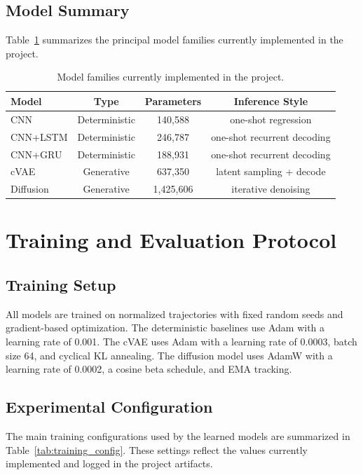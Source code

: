 \documentclass[11pt]{article}
\begin{document}
\subsection{Model Summary}

Table~\ref{tab:model_summary} summarizes the principal model families currently implemented in the project.

\begin{table}[h]
\centering
\caption{Model families currently implemented in the project.}
\label{tab:model_summary}
\begin{tabular}{lccc}
\toprule
Model & Type & Parameters & Inference Style \\
\midrule
CNN & Deterministic & 140,588 & one-shot regression \\
CNN+LSTM & Deterministic & 246,787 & one-shot recurrent decoding \\
CNN+GRU & Deterministic & 188,931 & one-shot recurrent decoding \\
cVAE & Generative & 637,350 & latent sampling + decode \\
Diffusion & Generative & 1,425,606 & iterative denoising \\
\bottomrule
\end{tabular}
\end{table}

\section{Training and Evaluation Protocol}

\subsection{Training Setup}

All models are trained on normalized trajectories with fixed random seeds and gradient-based optimization. The deterministic baselines use Adam with a learning rate of 0.001. The cVAE uses Adam with a learning rate of 0.0003, batch size 64, and cyclical KL annealing. The diffusion model uses AdamW with a learning rate of 0.0002, a cosine beta schedule, and EMA tracking.

\subsection{Experimental Configuration}

The main training configurations used by the learned models are summarized in Table~\ref{tab:training_config}. These settings reflect the values currently implemented and logged in the project artifacts.
\end{document}
